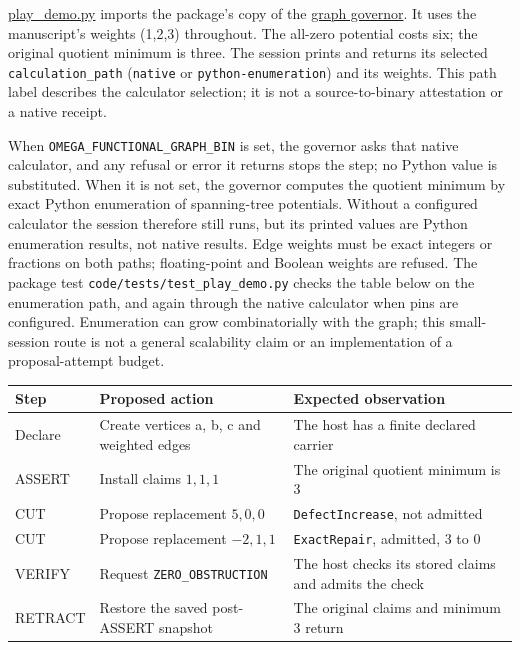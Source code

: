 \documentclass[
  11pt,
]{article}
\newcommand{\passthrough}[1]{#1}
\begin{document}
\href{code/play_demo.py}{play\_demo.py} imports the package's copy of
the \href{code/l1_symbol_game_governor.py}{graph governor}. It uses the
manuscript's weights (1,2,3) throughout. The all-zero potential costs
six; the original quotient minimum is three. The session prints and
returns its selected \nolinkurl{calculation_path}
(\passthrough{\lstinline!native!} or \nolinkurl{python-enumeration}) and
its weights. This path label describes the calculator selection; it is
not a source-to-binary attestation or a native receipt.

When \nolinkurl{OMEGA_FUNCTIONAL_GRAPH_BIN} is set, the governor asks
that native calculator, and any refusal or error it returns stops the
step; no Python value is substituted. When it is not set, the governor
computes the quotient minimum by exact Python enumeration of
spanning-tree potentials. Without a configured calculator the session
therefore still runs, but its printed values are Python enumeration
results, not native results. Edge weights must be exact integers or
fractions on both paths; floating-point and Boolean weights are refused.
The package test \nolinkurl{code/tests/test_play_demo.py} checks the
table below on the enumeration path, and again through the native
calculator when pins are configured. Enumeration can grow
combinatorially with the graph; this small-session route is not a
general scalability claim or an implementation of a proposal-attempt
budget.

\begin{longtable}[]{@{}
  >{\raggedright\arraybackslash}p{}
  >{\raggedright\arraybackslash}p{}
  >{\raggedright\arraybackslash}p{}@{}}
\toprule\noalign{}
\begin{minipage}[b]{\linewidth}\raggedright
Step
\end{minipage} & \begin{minipage}[b]{\linewidth}\raggedright
Proposed action
\end{minipage} & \begin{minipage}[b]{\linewidth}\raggedright
Expected observation
\end{minipage} \\
\midrule\noalign{}
\endhead
\bottomrule\noalign{}
\endlastfoot
Declare & Create vertices a, b, c and weighted edges & The host has a
finite declared carrier \\
ASSERT & Install claims \(1,\allowbreak 1,\allowbreak 1\) & The original
quotient minimum is 3 \\
CUT & Propose replacement \(5,\allowbreak 0,\allowbreak 0\) &
\nolinkurl{DefectIncrease}, not admitted \\
CUT & Propose replacement \(-2,\allowbreak 1,\allowbreak 1\) &
\passthrough{\lstinline!ExactRepair!}, admitted, 3 to 0 \\
VERIFY & Request \nolinkurl{ZERO_OBSTRUCTION} & The host checks its
stored claims and admits the check \\
RETRACT & Restore the saved post-ASSERT snapshot & The original claims
and minimum 3 return \\
\end{longtable}
\end{document}
